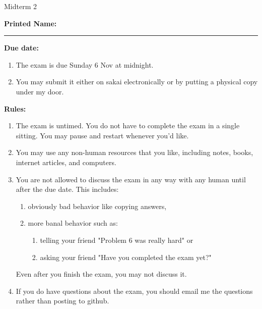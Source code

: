 \documentclass[10pt]{exam}
\theoremstyle{definition}
\begin{document}
\begin{center}
{
\Huge
    Midterm 2
}
\end{center}

\vspace{0.5in}
\noindent
\textbf{Printed Name:}

\noindent
\rule{\textwidth}{0.1pt}
\vspace{0.25in}

%
%
    \noindent
\textbf{Due date:}
\begin{enumerate}
    \item
        The exam is due Sunday 6 Nov at midnight.

    \item
        You may submit it either on sakai electronically or by putting a physical copy under my door.
\end{enumerate}

\vspace{0.15in}
\noindent
\textbf{Rules:}
\begin{enumerate}
    \item
        The exam is untimed.
        You do not have to complete the exam in a single sitting.
        You may pause and restart whenever you'd like.

    \item
    You may use any non-human resources that you like, including notes, books, internet articles, and computers.

    \item
    You are not allowed to discuss the exam in any way with any human until after the due date. This includes:
        \begin{enumerate}
            \item obviously bad behavior like copying answers, 
            \item more banal behavior such as:
                \begin{enumerate}
                    \item telling your friend "Problem 6 was really hard" or 
                    \item asking your friend "Have you completed the exam yet?"
                \end{enumerate}
        \end{enumerate}
        
        Even after you finish the exam, you may not discuss it.

    \item
    If you do have questions about the exam, you should email me the questions rather than posting to github.

\end{enumerate}
\end{document}
